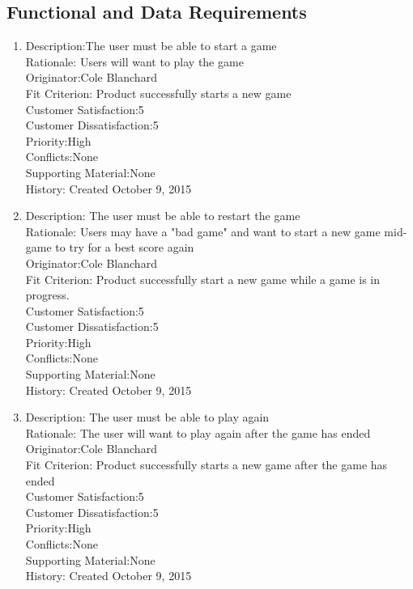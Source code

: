 \documentclass[12pt]{article}
\begin{document}
\subsection{Functional and Data Requirements}
\begin{enumerate}
 
 \item Description:The user must be able to start a game\\
 Rationale: Users will want to play the game\\
 Originator:Cole Blanchard\\
 Fit Criterion: Product successfully starts a new game\\
 Customer Satisfaction:5\\
 Customer Dissatisfaction:5\\
 Priority:High\\
 Conflicts:None\\
 Supporting Material:None\\
 History: Created October 9, 2015\\
 
 \item Description: The user must be able to restart the game\\
 Rationale: Users may have a "bad game" and want to start a new game mid-game to try for a best score again \\
 Originator:Cole Blanchard\\
 Fit Criterion: Product successfully start a new game while a game is in progress.\\
 Customer Satisfaction:5\\
 Customer Dissatisfaction:5\\
 Priority:High\\
 Conflicts:None\\
 Supporting Material:None\\
 History: Created October 9, 2015\\
 
 \item Description: The user must be able to play again\\
 Rationale: The user will want to play again after the game has ended\\
 Originator:Cole Blanchard\\
 Fit Criterion: Product successfully starts a new game after the game has ended\\
 Customer Satisfaction:5\\
 Customer Dissatisfaction:5\\
 Priority:High\\
 Conflicts:None\\
 Supporting Material:None\\
 History: Created October 9, 2015\\
 

\end{enumerate}
\end{document}
